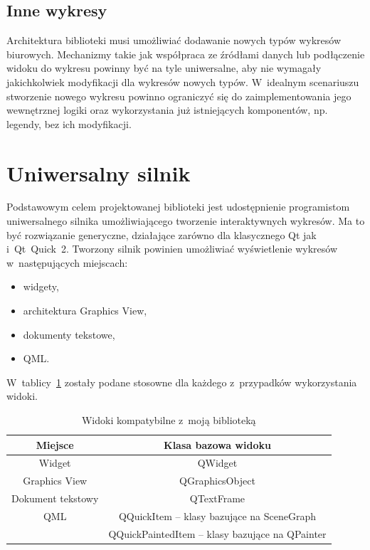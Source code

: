 \subsection{Inne wykresy}
Architektura biblioteki musi umożliwiać dodawanie nowych typów wykresów biurowych. Mechanizmy takie jak współpraca ze źródłami danych lub podłączenie widoku do wykresu powinny być na tyle uniwersalne, aby nie wymagały jakichkolwiek modyfikacji dla wykresów nowych typów. W~idealnym scenariuszu stworzenie nowego wykresu powinno ograniczyć się do zaimplementowania jego wewnętrznej logiki oraz wykorzystania już istniejących komponentów, np. legendy, bez ich modyfikacji.
 
\section{Uniwersalny silnik}
Podstawowym celem projektowanej biblioteki jest udostępnienie programistom uniwersalnego silnika umożliwiającego tworzenie interaktywnych wykresów. Ma to być rozwiązanie generyczne, działające zarówno dla klasycznego Qt jak i~Qt~Quick~2. Tworzony silnik powinien umożliwiać wyświetlenie wykresów w~następujących miejscach:
\begin{itemize}
\item{widgety,}
\item{architektura Graphics View,}
\item{dokumenty tekstowe,}
\item{QML.}
\end{itemize}

W~tablicy~\ref{tab:widoki} zostały podane stosowne dla każdego z~przypadków wykorzystania widoki.

\begin{table}[h]\footnotesize
\centering
\caption{Widoki kompatybilne z~moją biblioteką}
\label{tab:widoki}
\begin{tabular}{|c|c|}
\hline
Miejsce & Klasa bazowa widoku\\
\hline
Widget & QWidget\\
\hline
Graphics View & QGraphicsObject\\
\hline
Dokument tekstowy & QTextFrame\\
\hline
QML & QQuickItem -- klasy bazujące na SceneGraph\\
 & QQuickPaintedItem -- klasy bazujące na QPainter\\
\hline
\end{tabular}
\end{table}


